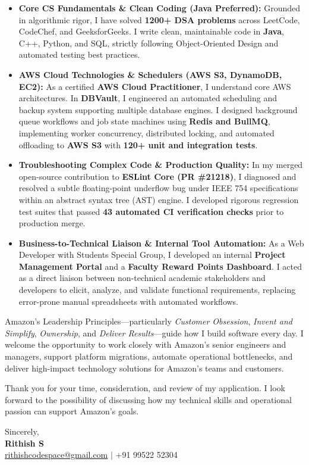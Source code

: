 \documentclass[letterpaper,11pt]{article}
\begin{document}
\begin{itemize}[leftmargin=0.2in, itemsep=2pt, topsep=1pt]
    \item \textbf{Core CS Fundamentals \& Clean Coding (Java Preferred):} Grounded in algorithmic rigor, I have solved \textbf{1200+ DSA problems} across LeetCode, CodeChef, and GeeksforGeeks. I write clean, maintainable code in \textbf{Java}, C++, Python, and SQL, strictly following Object-Oriented Design and automated testing best practices.
    \item \textbf{AWS Cloud Technologies \& Schedulers (AWS S3, DynamoDB, EC2):} As a certified \textbf{AWS Cloud Practitioner}, I understand core AWS architectures. In \textbf{DBVault}, I engineered an automated scheduling and backup system supporting multiple database engines. I designed background queue workflows and job state machines using \textbf{Redis and BullMQ}, implementing worker concurrency, distributed locking, and automated offloading to \textbf{AWS S3} with \textbf{120+ unit and integration tests}.
    \item \textbf{Troubleshooting Complex Code \& Production Quality:} In my merged open-source contribution to \textbf{ESLint Core (PR \#21218)}, I diagnosed and resolved a subtle floating-point underflow bug under IEEE 754 specifications within an abstract syntax tree (AST) engine. I developed rigorous regression test suites that passed \textbf{43 automated CI verification checks} prior to production merge.
    \item \textbf{Business-to-Technical Liaison \& Internal Tool Automation:} As a Web Developer with Students Special Group, I developed an internal \textbf{Project Management Portal} and a \textbf{Faculty Reward Points Dashboard}. I acted as a direct liaison between non-technical academic stakeholders and developers to elicit, analyze, and validate functional requirements, replacing error-prone manual spreadsheets with automated workflows.
\end{itemize}

Amazon's Leadership Principles---particularly \textit{Customer Obsession}, \textit{Invent and Simplify}, \textit{Ownership}, and \textit{Deliver Results}---guide how I build software every day. I welcome the opportunity to work closely with Amazon's senior engineers and managers, support platform migrations, automate operational bottlenecks, and deliver high-impact technology solutions for Amazon's teams and customers.

Thank you for your time, consideration, and review of my application. I look forward to the possibility of discussing how my technical skills and operational passion can support Amazon's goals.

\vspace{8pt}
Sincerely, \\ \vspace{2pt}
\textbf{Rithish S} \\
\href{mailto:rithishcodespace@gmail.com}{rithishcodespace@gmail.com} $|$ +91 99522 52304
\end{document}
